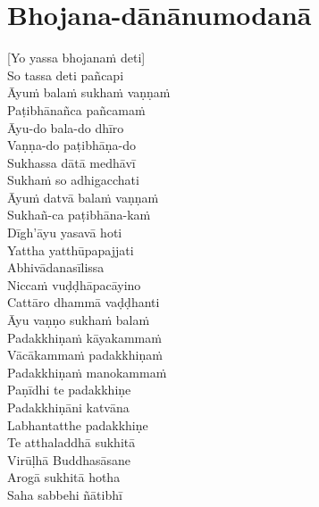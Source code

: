 \suttaRef{[Thai]}

\section{Bhojana-dānānumodanā}
\label{bhojana-dananumodana}

[Yo yassa bhojanaṁ deti]\\
So tassa deti pañcapi\\
Āyuṁ balaṁ sukhaṁ vaṇṇaṁ\\
Paṭibhānañca pañcamaṁ\\
Āyu-do bala-do dhīro\\
Vaṇṇa-do paṭibhāṇa-do\\
Sukhassa dātā medhāvī\\
Sukhaṁ so adhigacchati\\
Āyuṁ datvā balaṁ vaṇṇaṁ\\
Sukhañ-ca paṭibhāna-kaṁ\\
Dīgh'āyu yasavā hoti\\
Yattha yatthūpapajjati\\
Abhivādanasīlissa\\
Niccaṁ vuḍḍhāpacāyino\\
Cattāro dhammā vaḍḍhanti\\
Āyu vaṇṇo sukhaṁ balaṁ\\
Padakkhiṇaṁ kāyakammaṁ\\
Vācākammaṁ padakkhiṇaṁ\\
Padakkhiṇaṁ manokammaṁ\\
Paṇīdhi te padakkhiṇe\\
Padakkhiṇāni katvāna\\
Labhantatthe padakkhiṇe\\
Te atthaladdhā sukhitā\\
Virūḷhā Buddhasāsane\\
Arogā sukhitā hotha\\
Saha sabbehi ñātibhī

